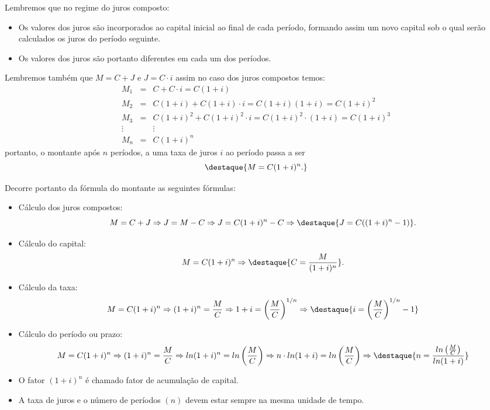  Lembremos que no regime do juros composto:
 \begin{itemize}
  \item Os valores dos juros são incorporados ao capital inicial ao final de cada período, formando assim um novo capital sob o qual serão calculados os juros do período seguinte.
  \item Os valores dos juros são portanto diferentes em cada um dos períodos.
 \end{itemize}
 Lembremos também que $M= C+J$ e $J= C \cdot i$ assim no caso dos juros compostos temos:
 \begin{eqnarray*}
  M_1&=& C + C \cdot i = C(1+i) \\
  M_2&=& C(1+i) + C(1+i)\cdot i = C(1+i)(1+i)= C(1+i)^2\\
  M_3&=& C(1+i)^2 + C(1+i)^2\cdot i= C(1+i)^2 \cdot (1+i) = C(1+i)^3 \\
  \vdots & & \vdots\\
  M_n&=& C(1+i)^n
 \end{eqnarray*}
 portanto, o montante após $n$ períodos, a uma taxa de juros $i$ ao período passa a ser
 \[\destaque{M= C(1+i)^n.}\]

 Decorre portanto da fórmula do montante as seguintes fórmulas:
 \begin{itemize}
  \item Cálculo dos juros compostos:
  \[M=C+J \Rightarrow J= M-C \Rightarrow J= C(1+i)^n - C \Rightarrow \destaque{J= C((1+i)^n - 1)}.\]
  \item Cálculo do capital:
  \[M= C(1+i)^n \Rightarrow \destaque{C= \frac{M}{(1+i)^n}}.\]
  \item Cálculo da taxa:
  \[M= C(1+i)^n \Rightarrow (1+i)^n= \frac{M}{C} \Rightarrow 1+i= \left(\frac{M}{C}\right)^{1/n} \Rightarrow \destaque{i= \left(\frac{M}{C}\right)^{1/n} -1}\]
  \item Cálculo do período ou prazo:
  \[M= C(1+i)^n \Rightarrow (1+i)^n= \frac{M}{C} \Rightarrow ln(1+i)^n= ln\left(\frac{M}{C}\right) \Rightarrow n \cdot ln(1+i)= ln\left(\frac{M}{C}\right) \Rightarrow \destaque{n= \frac{ln\left(\frac{M}{C}\right)}{ln(1+i)}}\]
 \end{itemize}

 \begin{obs}
 \begin{itemize}
  \item O fator $(1+i)^n$ é chamado fator de acumulação de capital.
  \item A taxa de juros e o número de períodos $(n)$ devem estar sempre na mesma unidade de tempo.
 \end{itemize}
 \end{obs}

 \newpage
